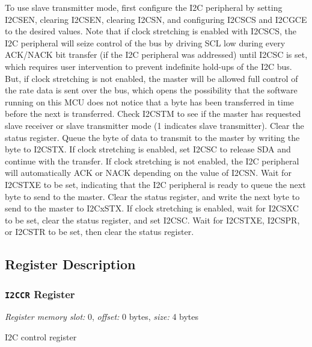 To use slave transmitter mode, first configure the I2C peripheral by setting I2CSEN, clearing I2CSEN, clearing I2CSN, and configuring I2CSCS and I2CGCE to the desired values. Note that if clock stretching is enabled with I2CSCS, the I2C peripheral will seize control of the bus by driving SCL low during every ACK/NACK bit transfer (if the I2C peripheral was addressed) until I2CSC is set, which requires user intervention to prevent indefinite hold-ups of the I2C bus. But, if clock stretching is not enabled, the master will be allowed full control of the rate data is sent over the bus, which opens the possibility that the software running on this MCU does not notice that a byte has been transferred in time before the next is transferred. Check I2CSTM to see if the master has requested slave receiver or slave transmitter mode (1 indicates slave transmitter). Clear the status register. Queue the byte of data to transmit to the master by writing the byte to I2CSTX. If clock stretching is enabled, set I2CSC to release SDA and continue with the transfer. If clock stretching is not enabled, the I2C peripheral will automatically ACK or NACK depending on the value of I2CSN. Wait for I2CSTXE to be set, indicating that the I2C peripheral is ready to queue the next byte to send to the master. Clear the status register, and write the next byte to send to the master to I2CxSTX. If clock stretching is enabled, wait for I2CSXC to be set, clear the status register, and set I2CSC. Wait for I2CSTXE, I2CSPR, or I2CSTR to be set, then clear the status register.

\subsection{Register Description}

\subsubsection{\texttt{I2CCR} Register} \label{ss:I2CxCR}
\noindent \textit{Register memory slot:} 0, \textit{offset:} 0 bytes, \textit{size:} 4 bytes

\noindent I2C control register

